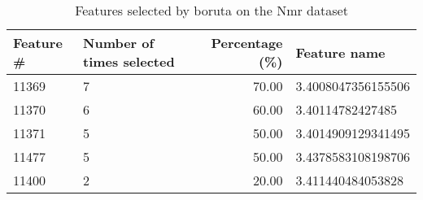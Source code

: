 \begin{table}
\caption{Features selected by boruta on the Nmr dataset}
\label{tab:features_boruta_nmr}
\begin{tabular}{llrl}
\toprule
Feature \# & Number of times selected & Percentage (\%) & Feature name \\
\midrule
11369 & 7 & 70.00 & 3.4008047356155506 \\
11370 & 6 & 60.00 & 3.40114782427485 \\
11371 & 5 & 50.00 & 3.4014909129341495 \\
11477 & 5 & 50.00 & 3.4378583108198706 \\
11400 & 2 & 20.00 & 3.411440484053828 \\
\bottomrule
\end{tabular}
\end{table}
